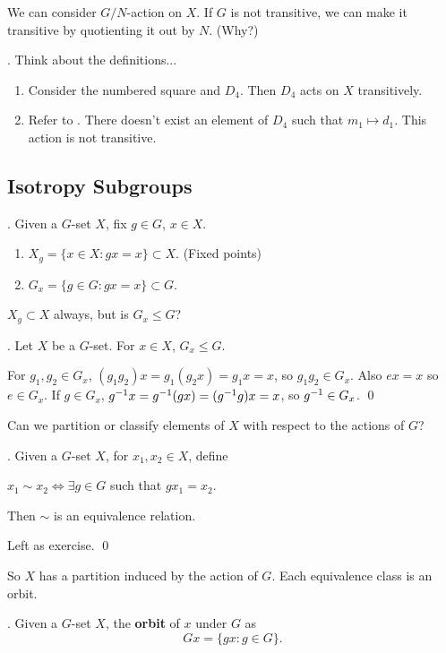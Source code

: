 We can consider \(G/N\)-action on \(X\). If \(G\) is not transitive, we can make it transitive by quotienting it out by \(N\). (Why?)

\ex. Think about the definitions...
\begin{enumerate}
    \item Consider the numbered square and \(D_4\). Then \(D_4\) acts on \(X\) transitively.
    \item Refer to . There doesn't exist an element of \(D_4\) such that \(m_1 \mapsto d_1\). This action is not transitive.
\end{enumerate}

\subsection*{Isotropy Subgroups}

. Given a \(G\)-set \(X\), fix \(g \in G\), \(x \in X\).
\begin{enumerate}
    \item \(X_g = \{x \in X : gx = x\} \subset X\). (Fixed points)
    \item {} \(G_x = \{g \in G : gx = x\} \subset G\).
\end{enumerate}

\(X_g \subset X\) always, but is \(G_x \leq G\)?

\thm. Let \(X\) be a \(G\)-set. For \(x \in X\), \(G_x \leq G\).

\pf For \(g_1, g_2 \in G_x\), \((g_1 g_2) x = g_1 (g_2 x) = g_1 x = x\), so \(g_1 g_2 \in G_x\). Also \(ex = x\) so \(e \in G_x\). If \(g \in G_x\), \(g^{-1} x = g^{-1} (gx) = (g^{-1} g)x = x\), so \(g^{-1} \in G_x\). \qed

Can we partition or classify elements of \(X\) with respect to the actions of \(G\)?

\thm. Given a \(G\)-set \(X\), for \(x_1, x_2 \in X\), define
\begin{center}
    \(x_1 \sim x_2 \iff \exists g \in G\) such that \(gx_1 = x_2\).
\end{center}
Then \(\sim\) is an equivalence relation.

\pf Left as exercise. \qed

So \(X\) has a partition induced by the action of \(G\). Each equivalence class is an orbit.

.  Given a \(G\)-set \(X\), the \textbf{orbit} of \(x\) under \(G\) as
\[
    Gx = \{gx : g\in G\}.
\]

